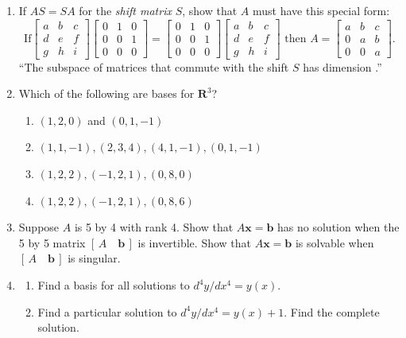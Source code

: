 \documentclass[14pt, a4paper]{article}
\begin{document}
\begin{enumerate}[resume]
    \item If $AS = SA$ for the \emph{shift matrix} $S$, show that $A$ must have this special form:
          \[
              \text{If} \begin{bmatrix} a & b & c \\ d & e & f \\ g & h & i \end{bmatrix} \begin{bmatrix} 0 & 1 & 0 \\ 0 & 0 & 1 \\ 0 & 0 & 0 \end{bmatrix} = \begin{bmatrix} 0 & 1 & 0 \\ 0 & 0 & 1 \\ 0 & 0 & 0 \end{bmatrix} \begin{bmatrix} a & b & c \\ d & e & f \\ g & h & i \end{bmatrix} \text{ then } A = \begin{bmatrix} a & b & c \\ 0 & a & b \\ 0 & 0 & a \end{bmatrix}.
          \]
          ``The subspace of matrices that commute with the shift $S$ has dimension \underline{\hspace{1cm}}.''

    \item Which of the following are bases for $\mathbf{R}^3$?
          \begin{enumerate}
              \item $(1, 2, 0)$ and $(0, 1, -1)$
              \item $(1, 1, -1), (2, 3, 4), (4, 1, -1), (0, 1, -1)$
              \item $(1, 2, 2), (-1, 2, 1), (0, 8, 0)$
              \item $(1, 2, 2), (-1, 2, 1), (0, 8, 6)$
          \end{enumerate}

    \item Suppose $A$ is 5 by 4 with rank 4. Show that $A\boldsymbol{x} = \boldsymbol{b}$ has no solution when the 5 by 5 matrix $[\, A \quad \boldsymbol{b} \,]$ is invertible. Show that $A\boldsymbol{x} = \boldsymbol{b}$ is solvable when $[\, A \quad \boldsymbol{b} \,]$ is singular.

    \item \begin{enumerate}
              \item Find a basis for all solutions to $d^4y/dx^4 = y(x)$.
              \item Find a particular solution to $d^4y/dx^4 = y(x) + 1$. Find the complete solution.
          \end{enumerate}
\end{enumerate}
\end{document}
